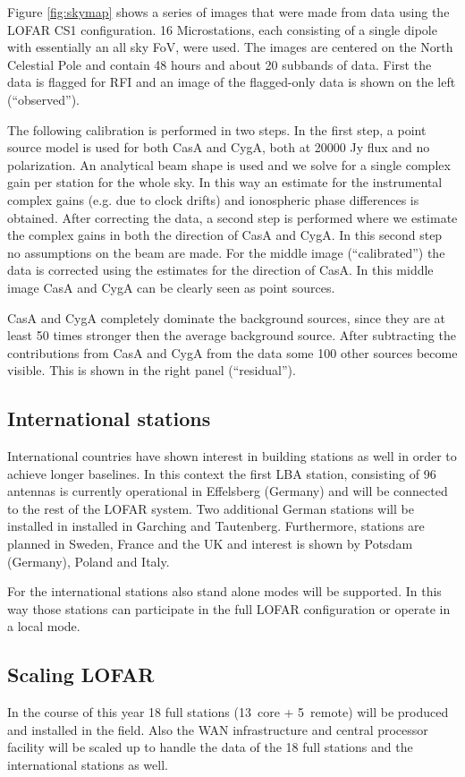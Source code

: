 \documentclass[journal]{IEEEtran}
\begin{document}
Figure \ref{fig:skymap} shows a series of images that were made from data using the LOFAR CS1 configuration. 16 Microstations, each consisting of a single dipole with essentially an all sky FoV, were used. The images are centered on the North Celestial Pole and contain 48 hours and about 20 subbands of data. First the data is flagged for RFI and an image of the flagged-only data is shown on the left (``observed''). 

The following calibration is performed in two steps. In the first step, a point source model is used for both CasA and CygA, both at 20000 Jy flux and no polarization. An analytical beam shape is used and we solve for a single complex gain per station for the whole sky. In this way an estimate for the instrumental complex gains (e.g. due to clock drifts) and ionospheric phase differences is obtained. After correcting the data, a second step is performed where we estimate the complex gains in both the direction of CasA and CygA. In this second step no assumptions on the beam are made. For the middle image (``calibrated'') the data is corrected using the estimates for the direction of CasA. In this middle image CasA and CygA can be clearly seen as point sources. 

CasA and CygA completely dominate the background sources, since they are at least 50 times stronger then the average background source. After subtracting the contributions from CasA and CygA from the data some 100 other sources become visible. This is shown in the right panel (``residual''). 

\subsection{International stations}
International countries have shown interest in building stations as well in order to achieve longer baselines. In this context the first LBA station, consisting of 96 antennas is currently operational in Effelsberg (Germany) and will be connected to the rest of the LOFAR system. Two additional German stations will be installed in installed in Garching and Tautenberg. Furthermore, stations are planned in Sweden, France and the UK and interest is shown by Potsdam (Germany), Poland and Italy.

For the international stations also stand alone modes will be supported. In this way those stations can participate in the full LOFAR configuration or operate in a local mode.

\subsection{Scaling LOFAR}
In the course of this year 18 full stations (13~core + 5~remote) will be produced and installed in the field. Also the WAN infrastructure and central processor facility will be scaled up to handle the data of the 18 full stations and the international stations as well. 
\end{document}

